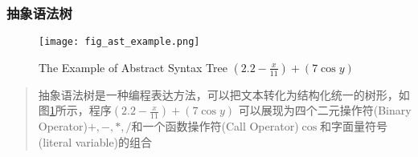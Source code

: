 \begin{frame}
    \frametitle{抽象语法树}
    \begin{figure}
        \centering
        \texttt{[image: fig\_ast\_example.png]}
        \caption{The Example of Abstract Syntax Tree $(2.2-\frac{x}{11})+(7\cos{y})$}
        \label{fig:ast_example}
    \end{figure}
    \begin{quote}    
抽象语法树是一种编程表达方法，可以把文本转化为结构化统一的树形，如图\ref{fig:ast_example}所示，程序$(2.2-\frac{x}{11})+(7\cos{y})$ 可以展现为四个二元操作符(Binary Operator)$+,-,*,/$和一个函数操作符(Call Operator)$\cos$和字面量符号(literal variable)的组合
    \end{quote}
\end{frame}